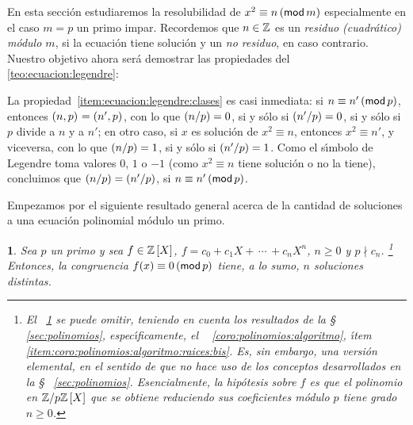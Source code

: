 \theoremstyle{plain}
\newtheorem{lemaResiduos}{\lemaname}[section]

\theoremstyle{definition}
\newtheorem{ejemResiduos}[lemaResiduos]{\ejemname}


En esta secci\'on estudiaremos la resolubilidad de
$x^2\equiv n\tmodulo[m]$ especialmente en el caso $m=p$ un primo impar.
Recordemos que $n\in\Enteros$ es un \emph{residuo (cuadr\'atico) m\'odulo $m$},
si la ecuaci\'on tiene soluci\'on y un \emph{no residuo}, en caso contrario.
Nuestro objetivo ahora ser\'a demostrar las propiedades del \teoname~%
\ref{teo:ecuacion:legendre}:

\teoEcuacionLegendre*

La propiedad~\eqref{item:ecuacion:legendre:clases} es casi inmediata:
si $n\equiv n'\tmodulo[p]$, entonces $\mcd{n,p}=\mcd{n',p}$, con lo que
$\tlegendre n p=0$, si y s\'olo si $\tlegendre{n'} p=0$, si y s\'olo si $p$
divide a $n$ y a $n'$; en otro caso, si $x$ es soluci\'on de $x^2\equiv n$,
entonces $x^2\equiv n'$, y viceversa, con lo que $\tlegendre n p=1$, si y
s\'olo si $\tlegendre{n'} p=1$. Como el s\'{\i}mbolo de Legendre toma valores
$0$, $1$ o $-1$ (como $x^2\equiv n$ tiene soluci\'on o no la tiene),
concluimos que $\tlegendre n p=\tlegendre{n'} p$, si $n\equiv n'\tmodulo[p]$.

Empezamos por el siguiente resultado general acerca de la cantidad de
soluciones a una ecuaci\'on polinomial m\'odulo un primo.

\begin{lemaResiduos}\label{lema:residuos:polinomios}
	Sea $p$ un primo y sea $f\in\polinomios\Enteros X$,
	$f=c_0+c_1X+\,\cdots\,+c_nX^n$, $n\geq 0$ y $p\nmid c_n$.%
	\footnote{
		El \lemaname~\ref{lema:residuos:polinomios} se puede omitir,
		teniendo en cuenta los resultados de la \S~%
		\ref{sec:polinomios}, espec\'{\i}ficamente, el \coroname~%
		\ref{coro:polinomios:algoritmo}, \'{\i}tem~%
		\eqref{item:coro:polinomios:algoritmo:raices:bis}. Es, sin
		embargo, una versi\'on elemental, en el sentido de que no
		hace uso de los conceptos desarrollados en la \S~%
		\ref{sec:polinomios}. Esencialmente, la hip\'otesis sobre $f$
		es que el polinomio en $\polinomios{\Enterosmod[p]} X$ que se
		obtiene reduciendo sus coeficientes m\'odulo $p$ tiene grado
		$n\geq 0$.
	}
	Entonces, la congruencia $f(x)\equiv 0\tmodulo[p]$ tiene, a lo sumo,
	$n$ soluciones distintas.
\end{lemaResiduos}

